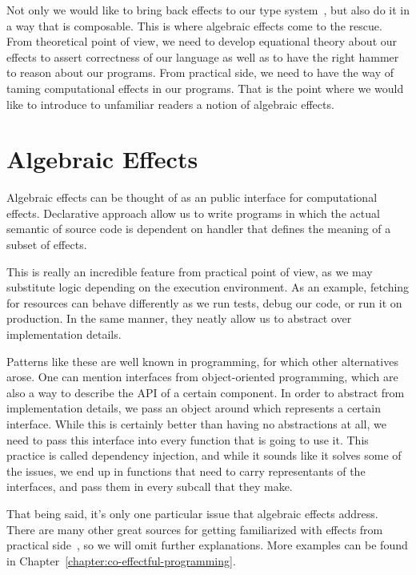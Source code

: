 \documentclass[declaration,shortabstract]{iithesis}
\theoremstyle{definition} \newtheorem{definition}{Definition}[chapter]
\theoremstyle{remark} \newtheorem{remark}[definition]{Observation}
\theoremstyle{plain} \newtheorem{theorem}[definition]{Theorem}
\theoremstyle{plain} \newtheorem{lemma}[definition]{Lemma}
\begin{document}
Not only we would like to bring back effects to our type
system~\cite{type-and-effect}, but also do it in a way that is composable. This
is where algebraic effects come to the rescue. From theoretical point of view,
we need to develop equational theory about our effects to assert correctness of
our language as well as to have the right hammer to reason about our programs.
From practical side, we need to have the way of taming computational effects
in our programs. That is the point where we would like to introduce to unfamiliar
readers a notion of algebraic effects.

\section{Algebraic Effects}

Algebraic effects can be thought of as an public interface for computational effects.
Declarative approach allow us to write programs in which the actual semantic of
source code is dependent on handler that defines the meaning of a subset of effects.

This is really an incredible feature from practical point of view, as we may substitute
logic depending on the execution environment. As an example, fetching for resources
can behave differently as we run tests, debug our code, or run it on production.
In the same manner, they neatly allow us to abstract over implementation details.

Patterns like these are well known in programming, for which other alternatives
arose. One can mention interfaces from object-oriented programming, which are also
a way to describe the API of a certain component. In order to abstract from
implementation details, we pass an object around which represents a certain
interface. While this is certainly better than having no abstractions at all,
we need to pass this interface into every function that is going to use it.
This practice is called dependency injection, and while it sounds like it solves
some of the issues, we end up in functions that need to carry representants
of the interfaces, and pass them in every subcall that they make.

That being said, it's only one particular issue that algebraic effects address.
There are many other great sources for getting familiarized with effects from
practical side~\cite{handlers-tutorial, programming-in-eff, koka-tutorial},
so we will omit further explanations. More examples can be found in
Chapter~\ref{chapter:co-effectful-programming}.
\end{document}
